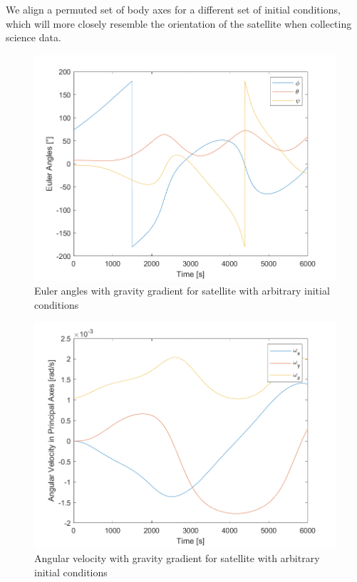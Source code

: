 We align a permuted set of body axes for a different set of initial conditions, which will more closely resemble the orientation of the satellite when collecting science data.

\begin{figure}[H]
\centering
\includegraphics[scale=0.6]{Images/ps4_problem4e_angle.png}
\caption{Euler angles with gravity gradient for satellite with arbitrary initial conditions}
\label{fig:ps4_problem4e_angle}
\end{figure}

\begin{figure}[H]
\centering
\includegraphics[scale=0.6]{Images/ps4_problem4e_angvel.png}
\caption{Angular velocity with gravity gradient for satellite with arbitrary initial conditions}
\label{fig:ps4_problem4e_angvel}
\end{figure}


